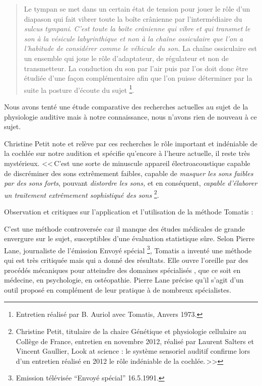 \begin{quotation}
Le tympan se met dans un certain état de tension pour jouer le
rôle d'un diapason qui fait vibrer toute la boîte crânienne
par l'intermédiaire du \emph{sulcus tympani}. 
\emph{C'est toute la boîte crânienne qui vibre et qui transmet le son à la vésicule labyrinthique et non à la chaîne ossiculaire que l'on a l'habitude de considérer comme le véhicule du son.} La chaîne ossiculaire est un ensemble qui
joue le rôle d'adaptateur, de régulateur et non de transmetteur. La
conduction du son par l'air puis par l'os doit donc
être étudiée d'une façon complémentaire afin que l'on
puisse déterminer par la suite la posture d'écoute du sujet%
\footnote{Entretien réalisé par B. Auriol avec Tomatis, Anvers 1973.}.
	
\end{quotation}

Nous avons tenté  une étude comparative des
recherches actuelles au sujet de la physiologie auditive mais à notre connaissance, nous n'avons rien de nouveau à ce sujet.

Christine Petit note et relève par ces recherches le rôle important
et indéniable de la cochlée sur notre audition et spécifie qu'encore
à l'heure actuelle, il reste très mystérieux. 
<<\,C'est une sorte de minuscule appareil électroacoustique capable
de discréminer des sons extrêmement faibles, capable de \emph{masquer
les sons faibles par des sons forts}, pouvant \emph{distordre les
sons,} et en conséquent, \emph{capable d'élaborer un traitement extrêmement
sophistiqué des sons}%
\footnote{Christine Petit, titulaire de la chaire Génétique et
	physiologie cellulaire au Collège de France, entretien en novembre 2012, réalisé par Laurent Salters et Vincent Gaullier, Look at science : le système sensoriel auditif confirme lors d'un entretien réalisé en 2012 le rôle indéniable de la cochlée.\,>>}.

Observation et critiques sur l'application et l'utilisation de
la méthode Tomatis :
 
C'est une méthode controversée car il manque des études médicales
de grande envergure sur le sujet, susceptibles d'une évaluation statistique
sûre. Selon Pierre Lane, journaliste de l'émission Envoyé spécial%
\footnote{Emission télévisée ``Envoyé spécial'' 16.5.1991.}, Tomatis
a inventé une méthode qui est très critiquée mais qui a donné des
résultats. Elle ouvre l'oreille par des procédés mécaniques pour atteindre
des domaines spécialisés , que ce soit en médecine, en psychologie,
en ostéopathie. Pierre Lane précise qu'il s'agit d'un outil proposé
en complément de leur pratique à de nombreux spécialistes. 

